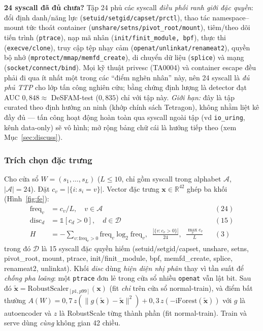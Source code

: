\documentclass[conference,10pt]{IEEEtran}
\begin{document}
\textbf{24 syscall đã đủ chưa?} Tập 24 phủ các syscall \textit{điều phối ranh giới đặc quyền}: đổi định danh/năng lực (\texttt{setuid/setgid/capset/prctl}), thao tác namespace--mount tức thoát container (\texttt{unshare/setns/pivot\_root/mount}), tiêm/theo dõi tiến trình (\texttt{ptrace}), nạp mã nhân (\texttt{init/finit\_module, bpf}), thực thi (\texttt{execve/clone}), truy cập tệp nhạy cảm (\texttt{openat/unlinkat/renameat2}), quyền bộ nhớ (\texttt{mprotect/mmap/memfd\_create}), di chuyển dữ liệu (\texttt{splice}) và mạng (\texttt{socket/connect/bind}). Mọi kỹ thuật privesc (TA0004) và container escape đều phải đi qua ít nhất một trong các ``điểm nghẽn nhân'' này, nên 24 syscall là \textit{đủ phủ TTP} cho lớp tấn công nghiên cứu; bằng chứng định lượng là detector đạt AUC $0{,}848 \approx$ DeSFAM-test ($0{,}835$) chỉ với tập này. \textit{Giới hạn:} đây là tập curated theo định hướng an ninh (khớp chính sách Tetragon), không nhằm liệt kê đầy đủ — tấn công hoạt động hoàn toàn qua syscall ngoài tập (vd \texttt{io\_uring}, kênh data-only) sẽ vô hình; mở rộng bảng chữ cái là hướng tiếp theo (xem Mục~\ref{sec:discuss}).

\subsubsection{Trích chọn đặc trưng}
Cho cửa sổ $W=(s_1,\dots,s_L)$ ($L\le 10$, chỉ gồm syscall trong alphabet $\mathcal{A}$, $|\mathcal{A}|=24$). Đặt $c_v=|\{i: s_i=v\}|$. Vector đặc trưng $\mathbf{x}\in\mathbb{R}^{42}$ ghép ba khối (Hình~\ref{fig:fe}):
\begin{align*}
\text{freq}_v &= c_v/L, \quad v\in\mathcal{A} && (24)\\
\text{disc}_d &= \mathbb{1}[c_d>0], \quad d\in\mathcal{D} && (15)\\
H &= -\!\!\sum_{v:\text{freq}_v>0}\!\!\text{freq}_v\log_2 \text{freq}_v,\;\; \tfrac{|\{v:c_v>0\}|}{24},\;\; \tfrac{\max_v c_v}{L} && (3)
\end{align*}
trong đó $\mathcal{D}$ là 15 syscall đặc quyền hiếm (setuid/setgid/capset, unshare, setns, pivot\_root, mount, ptrace, init/finit\_module, bpf, memfd\_create, splice, renameat2, unlinkat). Khối \textit{disc} dùng \textit{hiện diện nhị phân} thay vì tần suất để \textit{chống pha loãng}: một \texttt{ptrace} đơn lẻ trong cửa sổ nhiều \texttt{openat} vẫn lật bit. Sau đó $\tilde{\mathbf{x}}=\mathrm{RobustScaler}_{[p1,p99]}(\mathbf{x})$ (fit \textit{chỉ} trên cửa sổ normal-train), và điểm bất thường $A(W)=0{,}7\,z(\lVert g(\tilde{\mathbf{x}})-\tilde{\mathbf{x}}\rVert^2)+0{,}3\,z(-\mathrm{iForest}(\tilde{\mathbf{x}}))$ với $g$ là autoencoder và $z$ là RobustScale từng thành phần (fit normal-train). Train và serve dùng \textit{cùng} không gian 42 chiều.
\end{document}
